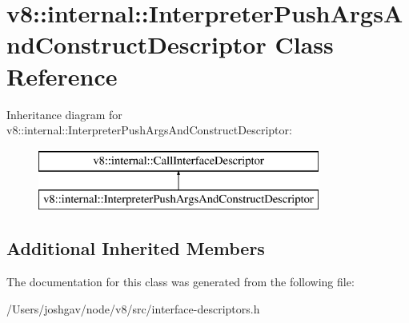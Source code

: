 \hypertarget{classv8_1_1internal_1_1_interpreter_push_args_and_construct_descriptor}{}\section{v8\+:\+:internal\+:\+:Interpreter\+Push\+Args\+And\+Construct\+Descriptor Class Reference}
\label{classv8_1_1internal_1_1_interpreter_push_args_and_construct_descriptor}
Inheritance diagram for v8\+:\+:internal\+:\+:Interpreter\+Push\+Args\+And\+Construct\+Descriptor\+:\begin{figure}[H]
\begin{center}
\leavevmode
\includegraphics[height=2.000000cm]{classv8_1_1internal_1_1_interpreter_push_args_and_construct_descriptor}
\end{center}
\end{figure}
\subsection*{Additional Inherited Members}


The documentation for this class was generated from the following file\+:\begin{DoxyCompactItemize}
\item 
/\+Users/joshgav/node/v8/src/interface-\/descriptors.\+h\end{DoxyCompactItemize}
